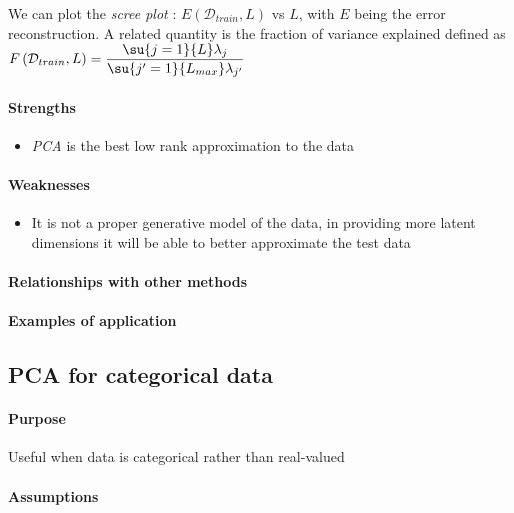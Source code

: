 We can plot the \emph{scree plot} : $E(\mathcal{D}_{train}, L)$ vs $L$, with $E$ being
the error reconstruction. 
A related quantity is the fraction of variance explained defined as $F\left(
\mathcal{D}_{train}, L\right) = \dfrac{\su{j=1}{L}\lambda_{j}}{\su{j'=1}{L_{max}}
\lambda_{j'}}$

\paragraph{Strengths}
\begin{itemize}
    \item \emph{PCA} is the best low rank approximation to the data
\end{itemize}

\paragraph{Weaknesses}
\begin{itemize}
    \item It is not a proper generative model of the data, in providing more latent 
        dimensions it will be able to better approximate the test data
\end{itemize}
\paragraph{Relationships with other methods}
\paragraph{Examples of application}

\subsection{PCA for categorical data}
\paragraph{Purpose}
Useful when data is categorical rather than real-valued
\paragraph{Assumptions}
